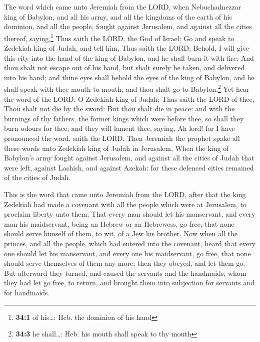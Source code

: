  The word which came unto Jeremiah from the LORD, when
Nebuchadnezzar king of Babylon, and all his army, and all the kingdoms
of the earth of his dominion, and all the people, fought against
Jerusalem, and against all the cities thereof, saying,\footnote{\textbf{34:1}
  of his\ldots: Heb. the dominion of his hand}  Thus saith
the LORD, the God of Israel; Go and speak to Zedekiah king of Judah, and
tell him, Thus saith the LORD; Behold, I will give this city into the
hand of the king of Babylon, and he shall burn it with fire:
 And thou shalt not escape out of his hand, but shalt
surely be taken, and delivered into his hand; and thine eyes shall
behold the eyes of the king of Babylon, and he shall speak with thee
mouth to mouth, and thou shalt go to Babylon.\footnote{\textbf{34:3} he
  shall\ldots: Heb. his mouth shall speak to thy mouth} 
Yet hear the word of the LORD, O Zedekiah king of Judah; Thus saith the
LORD of thee, Thou shalt not die by the sword:  But thou
shalt die in peace: and with the burnings of thy fathers, the former
kings which were before thee, so shall they burn odours for thee; and
they will lament thee, saying, Ah lord! for I have pronounced the word,
saith the LORD.  Then Jeremiah the prophet spake all these
words unto Zedekiah king of Judah in Jerusalem,  When the
king of Babylon's army fought against Jerusalem, and against all the
cities of Judah that were left, against Lachish, and against Azekah: for
these defenced cities remained of the cities of Judah.

 This is the word that came unto Jeremiah from the LORD,
after that the king Zedekiah had made a covenant with all the people
which were at Jerusalem, to proclaim liberty unto them; 
That every man should let his manservant, and every man his maidservant,
being an Hebrew or an Hebrewess, go free; that none should serve himself
of them, to wit, of a Jew his brother.  Now when all the
princes, and all the people, which had entered into the covenant, heard
that every one should let his manservant, and every one his maidservant,
go free, that none should serve themselves of them any more, then they
obeyed, and let them go.  But afterward they turned, and
caused the servants and the handmaids, whom they had let go free, to
return, and brought them into subjection for servants and for handmaids.

